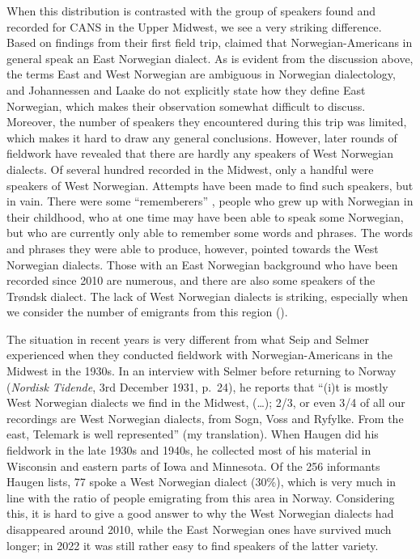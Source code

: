 \documentclass[output=paper]{langscibook}
\begin{document}
When this distribution is contrasted with the group of speakers found and recorded for CANS in the Upper Midwest, we see a very striking difference. Based on findings from their first field trip, \citet{JohannessenLaake2012} claimed that Norwegian\hyp Americans in general speak an East Norwegian dialect. As is evident from the discussion above, the terms East and West Norwegian are ambiguous in Norwegian dialectology, and Johannessen and Laake do not explicitly state how they define East Norwegian, which makes their observation somewhat difficult to discuss. Moreover, the number of speakers they encountered during this trip was limited, which makes it hard to draw any general conclusions. However, later rounds of fieldwork have revealed that there are hardly any speakers of West Norwegian dialects. Of several hundred recorded in the Midwest, only a handful were speakers of West Norwegian. Attempts have been made to find such speakers, but in vain. There were some 
“rememberers” \citep[51]{GrinevaldBert2011}, people who grew up with Norwegian in their childhood, who at one time may have been able to speak some Norwegian, but who are currently only able to remember some words and phrases. The words and phrases they were able to produce, however, pointed towards the West Norwegian dialects. Those with an East Norwegian background who have been recorded since 2010 are numerous, and there are also some speakers of the Trøndsk dialect. The lack of West Norwegian dialects is striking, especially when we consider the number of emigrants from this region ().

The situation in recent years is very different from what Seip and Selmer experienced when they conducted fieldwork with Norwegian\hyp Americans in the Midwest in the 1930s. In an interview with Selmer before returning to Norway (\textit{Nordisk Tidende}, 3rd December 1931, p.~24), he reports that “(i)t is mostly West Norwegian dialects we find in the Midwest, (…); 2/3, or even 3/4 of all our recordings are West Norwegian dialects, from Sogn, Voss and Ryfylke. From the east, Telemark is well represented” (my translation). When Haugen did his fieldwork in the late 1930s and 1940s, he collected most of his material in Wisconsin and eastern parts of Iowa and Minnesota. Of the 256 informants Haugen lists, 77 spoke a West Norwegian dialect (30\%), which is very much in line with the ratio of people emigrating from this area in Norway. Considering this, it is hard to give a good answer to why the West Norwegian dialects had disappeared around 2010, while the East Norwegian ones have survived much longer; in 2022 it was still rather easy to find speakers of the latter variety. 
\end{document}
